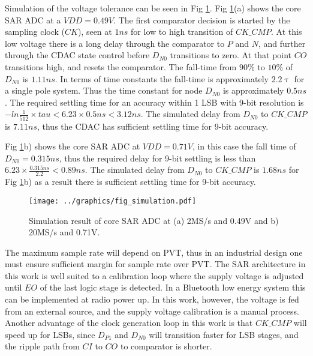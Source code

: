 Simulation of the voltage tolerance can be seen in Fig
\ref{fig_sim}. Fig \ref{fig_sim}(a) shows the core SAR ADC at a
$VDD=0.49V$. 
The first comparator decision is started by the sampling clock ($CK$),
seen at $1ns$ for low to high transition of $CK\_CMP$. At this low voltage
there is a long delay through the comparator to $P$ and $N$, and
further through the CDAC state control before $D_{N0}$ transitions to
zero. At that point $CO$ transitions high, and resets the
comparator. The fall-time from $90\%$ to $10\%$ of $D_{N0}$ is
$1.11ns$. In terms of time constants the fall-time is approximately
$ 2.2 \uptau$ for a single pole system. Thus the time constant for
node $D_{N0}$ is approximately $0.5ns$. The required settling
time for an accuracy within 1 LSB with 9-bit resolution is $-ln\frac{1}{512} \times tau <
6.23 \times 0.5ns < 3.12ns $. The simulated delay from $D_{N0}$ to $CK\_CMP$ is $7.11ns$, thus the CDAC has
sufficient settling time for 9-bit accuracy.

Fig \ref{fig_sim}b) shows the core SAR ADC at $VDD=0.71V$, in this
case the fall time of $D_{N0} = 0.315ns$, thus the required delay for
9-bit settling is
less than $6.23 \times \frac{0.315ns}{2.2} < 0.89ns$.  The
simulated delay from $D_{N0}$ to $CK\_CMP$ is
$1.68ns$ for Fig \ref{fig_sim}b) as a result there is sufficient
settling time for 9-bit accuracy.

\begin{figure}[tb]
\centerline{\texttt{[image: ../graphics/fig\_simulation.pdf]}}
\caption{Simulation result of core SAR ADC at (a) 2MS/s and 0.49V and
  b) 20MS/s and 0.71V. }
\label{fig_sim}
\end{figure}


The maximum sample rate will depend on
PVT, thus in an industrial design one must ensure sufficient margin for
sample rate over PVT. The SAR architecture in this work is well suited to a
calibration loop where the supply voltage is adjusted until $EO$ of
the last logic stage is detected. In a Bluetooth\textsuperscript{\textregistered} low energy system this can be implemented at
radio power up. In this work, however, the voltage is fed from an external source, and the supply voltage calibration is a manual process. Another advantage of the clock generation loop in this work is that $CK\_CMP$ will
speed up for LSBs, since $D_{P1}$ and $D_{N0}$ will transition faster for
LSB stages, and the ripple path from $CI$ to $CO$ to
comparator is shorter.


